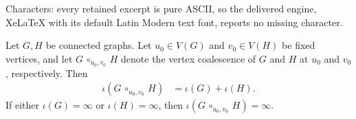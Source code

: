 \documentclass[10pt,a4paper]{amsart}
\newcommand{\Circ}{\circ}
\begin{document}
Characters: every retained excerpt is pure ASCII, so the delivered engine, XeLaTeX with its default Latin Modern text font, reports no missing character.
    \begin{theorem}\label{thm:merging}
        Let $G, H$ be connected graphs. Let $u_{0}\in V(G)$ and $v_{0}\in V(H)$ be fixed vertices, and let $G\,\Circ_{u_{0},v_{0}}\,H$ denote the vertex coalescence of $G$ and $H$ at $u_{0}$ and $v_{0}$, respectively. Then
            \begin{align*}
                \iota(G\,\Circ_{u_{0},v_{0}}\,H) &= \iota(G) + \iota(H).
            \end{align*}
        If either $\iota(G) = \infty$ or $\iota(H) = \infty$, then $\iota(G\,\Circ_{u_{0},v_{0}}\,H)=\infty$.
    \end{theorem}
\end{document}
